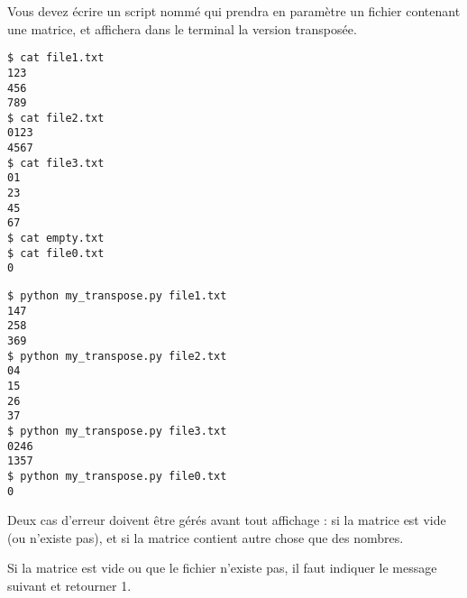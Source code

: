 

\vspace*{0.7cm}

\noindent {}

\bigskip


\noindent Vous devez écrire un script nommé  qui prendra en paramètre un fichier contenant une matrice, et affichera dans le terminal la version transposée.



\smallskip

\lstset{language=sh}
\begin{lstlisting}[frame=single,title={Exemples de fichiers d'entrée}]
$ cat file1.txt
123
456
789
$ cat file2.txt
0123
4567
$ cat file3.txt
01
23
45
67
$ cat empty.txt
$ cat file0.txt
0
\end{lstlisting}



\smallskip

\lstset{language=sh}
\begin{lstlisting}[frame=single,title={Cas général}]
$ python my_transpose.py file1.txt
147
258
369
$ python my_transpose.py file2.txt
04
15
26
37
$ python my_transpose.py file3.txt
0246
1357
$ python my_transpose.py file0.txt
0
\end{lstlisting}

\bigskip

\noindent Deux cas d'erreur doivent être gérés avant tout affichage : si la matrice est vide (ou n'existe pas), et si la matrice contient autre chose que des nombres.

\noindent Si la matrice est vide ou que le fichier n'existe pas, il faut indiquer le message suivant et retourner 1.

\bigskip

\noindent {}

